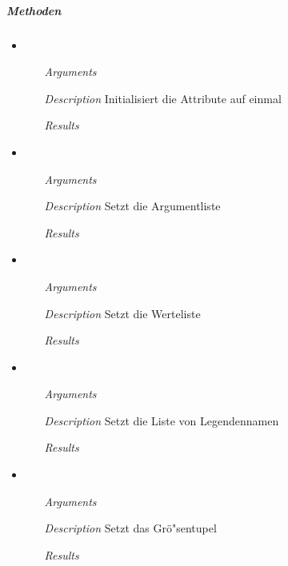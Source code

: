 \subparagraph{Methoden}
\begin{itemize}
  
\item {}
\begin{enumerate}
\item[\textit{Arguments}] 
\item[\textit{Description}] Initialisiert die Attribute auf einmal
\item[\textit{Results}] 
\end{enumerate}

\item {}
\begin{enumerate}
\item[\textit{Arguments}] 
\item[\textit{Description}] Setzt die Argumentliste
\item[\textit{Results}] 
\end{enumerate}

\item {}
\begin{enumerate}
\item[\textit{Arguments}] 
\item[\textit{Description}] Setzt die Werteliste
\item[\textit{Results}] 
\end{enumerate}

\item {}
\begin{enumerate}
\item[\textit{Arguments}] 
\item[\textit{Description}] Setzt die Liste von Legendennamen
\item[\textit{Results}] 
\end{enumerate}

\item {}
\begin{enumerate}
\item[\textit{Arguments}] 
\item[\textit{Description}] Setzt das Gr\"o"sentupel
\item[\textit{Results}] 
\end{enumerate}


\end{itemize}
